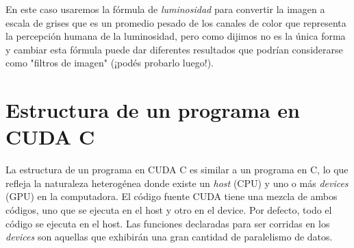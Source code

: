 En este caso usaremos la fórmula de \textit{luminosidad} para convertir la imagen a escala de grises que es un promedio
pesado de los canales de color que representa la percepción humana de la luminosidad, pero como dijimos no es la única
forma y cambiar esta fórmula puede dar diferentes resultados que podrían considerarse como "filtros de imagen" (¡podés
probarlo luego!).


\section*{Estructura de un programa en CUDA C}

La estructura de un programa en CUDA C es similar a un programa en C, lo que refleja la naturaleza heterogénea donde
existe un \textit{host} (CPU) y uno o más \textit{devices} (GPU) en la computadora. El código fuente CUDA tiene una
mezcla de ambos códigos, uno que se ejecuta en el host y otro en el device. Por defecto, todo el código se ejecuta en el
host. Las funciones declaradas para ser corridas en los \textit{devices} son aquellas que exhibirán una gran cantidad de
paralelismo de datos.


